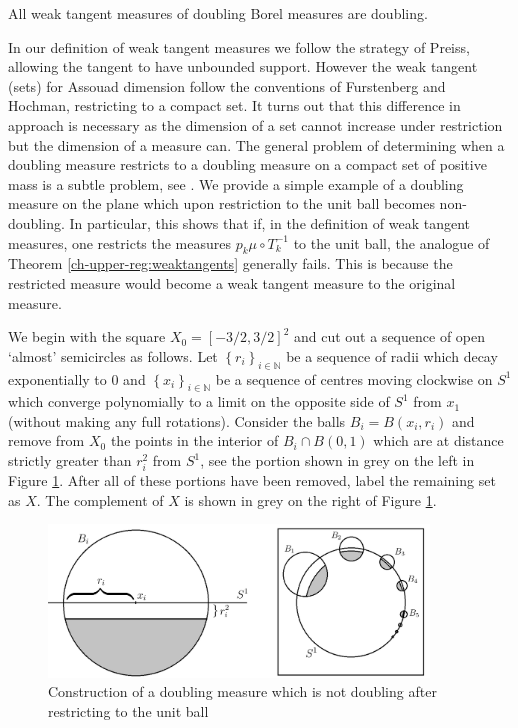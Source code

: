 \begin{corollary}
	All weak tangent measures of  doubling Borel measures are doubling.
\end{corollary}



In our definition of weak tangent measures we follow the strategy of Preiss, allowing the tangent to have unbounded support. However the weak tangent (sets) for Assouad dimension follow the conventions of Furstenberg and Hochman, restricting to a compact set. It turns out that this difference in approach is necessary as the dimension of a set cannot increase under restriction but the dimension of a measure can. The general problem of determining when a doubling measure restricts to a doubling measure on a compact set of positive mass is a subtle problem, see \cite{ojala}.  We provide a simple example of a doubling measure on the plane which upon restriction to the unit ball becomes non-doubling.  In particular, this shows that if, in the definition of weak tangent measures, one restricts the measures $p_k \mu \circ T^{-1}_k$ to the unit ball, the analogue of Theorem \ref{ch-upper-reg:weaktangents} generally fails. This is because the restricted measure would become a weak tangent measure to the original measure.

We begin with the square $X_0 = [-3/2, 3/2]^2$ and cut out a sequence of open   `almost' semicircles as follows.   Let $\left\{r_i \right\}_{i\in \mathbb{N}}$ be a sequence of radii which decay exponentially to 0 and $\left\{x_i\right\}_{i\in \mathbb{N}}$ be a sequence of centres moving clockwise on  $S^1$ which converge polynomially to a limit on the opposite side of $S^1$ from $x_1$ (without making any full rotations). Consider the balls $B_i = B(x_i, r_i)$ and remove from $X_0$ the points in the interior of  $B_i \cap B(0,1)$ which are at distance strictly greater than $r_i^2$ from $S^1$, see the portion shown in grey on the left in Figure \ref{ch-upper-reg:example}.  After all of these portions have been removed, label the remaining set as $X$.  The complement of $X$ is shown in grey on the right of Figure \ref{ch-upper-reg:example}. 

\begin{figure}[h]
	\centering
	\includegraphics[width=0.9\textwidth]{pics/ch-upper-reg/example.png}
	\caption{Construction of a doubling measure which is not doubling after restricting to the unit ball}
	\label{ch-upper-reg:example}
\end{figure}

